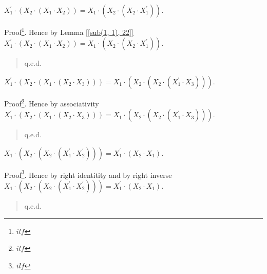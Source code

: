 \documentclass[a4]{article}
\newenvironment{ilfproof}[1]{%
Proof\/\footnote{#1}.}{\begin{quote}\raggedleft q.e.d.\end{quote}}
\begin{document}
\begin{Lemma}\label{[sub(1, 1), 33]}

$ X_{1} ^{\prime}  \cdot  (X_{2} \cdot  (X_{1} \cdot  X_{2})) = X_{1} \cdot  (X_{2} \cdot  (X_{2} \cdot  X_{1} ^{\prime} )) $.

\end{Lemma}



\begin{ilfproof}{$ ilf $} Hence by Lemma \ref{[sub(1, 1), 22]} $ X_{1} ^{\prime}  \cdot  (X_{2} \cdot  (X_{1} \cdot  X_{2})) = X_{1} \cdot  (X_{2} \cdot  (X_{2} \cdot  X_{1} ^{\prime} )). $





\end{ilfproof}

\begin{Lemma}\label{[sub(1, 1), 34]}

$ X_{1} ^{\prime}  \cdot  (X_{2} \cdot  (X_{1} \cdot  (X_{2} \cdot  X_{3}))) = X_{1} \cdot  (X_{2} \cdot  (X_{2} \cdot  (X_{1} ^{\prime}  \cdot  X_{3}))) $.

\end{Lemma}



\begin{ilfproof}{$ ilf $} Hence by $ $associativity$ $ $ X_{1} ^{\prime}  \cdot  (X_{2} \cdot  (X_{1} \cdot  (X_{2} \cdot  X_{3}))) = X_{1} \cdot  (X_{2} \cdot  (X_{2} \cdot  (X_{1} ^{\prime}  \cdot  X_{3}))). $





\end{ilfproof}

\begin{Lemma}\label{[sub(1, 1), 36]}

$ X_{1} \cdot  (X_{2} \cdot  (X_{2} \cdot  (X_{1} ^{\prime}  \cdot  X_{2} ^{\prime} ))) = X_{1} ^{\prime}  \cdot  (X_{2} \cdot  X_{1}) $.

\end{Lemma}



\begin{ilfproof}{$ ilf $} Hence by $ $right identitity$ $ and by $ $right inverse$ $ $ X_{1} \cdot  (X_{2} \cdot  (X_{2} \cdot  (X_{1} ^{\prime}  \cdot  X_{2} ^{\prime} ))) = X_{1} ^{\prime}  \cdot  (X_{2} \cdot  X_{1}). $





\end{ilfproof}
\end{document}

